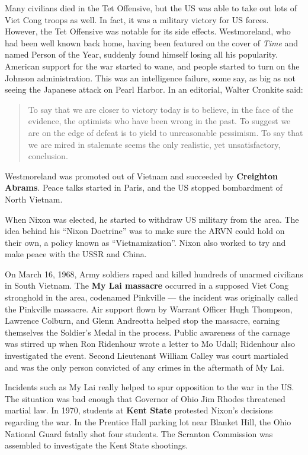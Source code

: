 Many civilians died in the Tet Offensive,
but the US was able to take out lots of Viet Cong troops as well.
In fact, it was a military victory for US forces.
However, the Tet Offensive was notable for its side effects.
Westmoreland, who had been well known back home,
having been featured on the cover of \textit{Time} and named Person of the Year,
suddenly found himself losing all his popularity.
American support for the war started to wane,
and people started to turn on the Johnson administration.
This was an intelligence failure,
some say, as big as not seeing the Japanese attack on Pearl Harbor.
In an editorial, Walter Cronkite said:
\begin{quote}
  To say that we are closer to victory today is to believe, in the face of the evidence,
  the optimists who have been wrong in the past.
  To suggest we are on the edge of defeat is to yield to unreasonable pessimism.
  To say that we are mired in stalemate seems the only realistic, yet unsatisfactory, conclusion.
\end{quote}
Westmoreland was promoted out of Vietnam and succeeded by \textbf{Creighton Abrams}.
Peace talks started in Paris, and the US stopped bombardment of North Vietnam.

When Nixon was elected, he started to withdraw US military from the area.
The idea behind his ``Nixon Doctrine'' was to make sure the ARVN could hold on their own,
a policy known as ``Vietnamization''.
Nixon also worked to try and make peace with the USSR and China.

On March 16, 1968, Army soldiers raped and killed hundreds of unarmed civilians in South Vietnam.
The \textbf{My Lai massacre} occurred in a supposed Viet Cong stronghold in the area,
codenamed Pinkville --- the incident was originally called the Pinkville massacre.
Air support flown by Warrant Officer Hugh Thompson, Lawrence Colburn, and Glenn Andreotta
helped stop the massacre,
earning themselves the Soldier's Medal in the process.
Public awareness of the carnage was stirred up when Ron Ridenhour wrote a letter to Mo Udall;
Ridenhour also investigated the event.
Second Lieutenant William Calley was court martialed
and was the only person convicted of any crimes in the aftermath of My Lai.

Incidents such as My Lai really helped to spur opposition to the war in the US\@.
The situation was bad enough that Governor of Ohio Jim Rhodes threatened martial law.
In 1970, students at \textbf{Kent State} protested Nixon's decisions regarding the war.
In the Prentice Hall parking lot near Blanket Hill,
the Ohio National Guard fatally shot four students.
The Scranton Commission was assembled to investigate the Kent State shootings.

